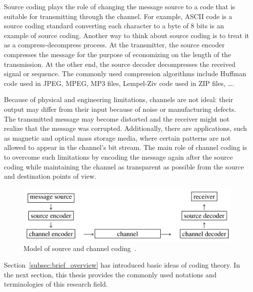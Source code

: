 Source coding plays the role of changing the message source to a code that is suitable for transmitting through the channel. For example, ASCII code is a source coding standard converting each character to a byte of 8 bits is an example of source coding. Another way to think about source coding is to treat it as a compress-decompress process. At the transmitter, the source encoder compresses the message for the purpose of economizing on the length of the transmission. At the other end, the source decoder decompresses the received signal or sequence. The commonly used compression algorithms include Huffman code used in JPEG, MPEG, MP3 files, Lempel-Ziv code used in ZIP files, \dots.

Because of physical and engineering limitations, channels are not ideal: their output may differ from their input because of noise or manufacturing defects. The transmitted message may become distorted and the receiver might not realize that the message was corrupted. Additionally, there are applications, such as magnetic and optical mass storage media, where certain patterns are not allowed to appear in the channel's bit stream. The main role of channel coding is to overcome such limitations by encoding the message again after the source coding while maintaining the channel as transparent as possible from the source and destination points of view. 

\begin{figure}
    \centering
    \includegraphics[scale=0.5]{fig/sourceandchannelcoding.png}
    \caption{Model of source and channel coding~\cite{ling2004coding}.}
    \label{fig:sourcechannelcoding}
\end{figure}

Section~\ref{subsec:brief_overview} has introduced basic ideas of coding theory. In the next section, this thesis provides the commonly used notations and terminologies of this research field.
